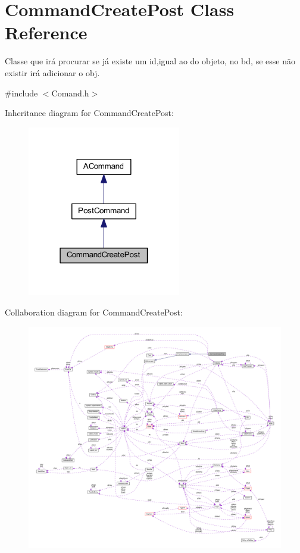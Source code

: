 \hypertarget{class_command_create_post}{\section{Command\-Create\-Post Class Reference}
\label{class_command_create_post}
}


Classe que irá procurar se já existe um id,igual ao do objeto, no bd, se esse não existir irá adicionar o obj.  




{\ttfamily \#include $<$Comand.\-h$>$}



Inheritance diagram for Command\-Create\-Post\-:\nopagebreak
\begin{figure}[H]
\begin{center}
\leavevmode
\includegraphics[width=190pt]{class_command_create_post__inherit__graph}
\end{center}
\end{figure}


Collaboration diagram for Command\-Create\-Post\-:\nopagebreak
\begin{figure}[H]
\begin{center}
\leavevmode
\includegraphics[width=350pt]{class_command_create_post__coll__graph}
\end{center}
\end{figure}
